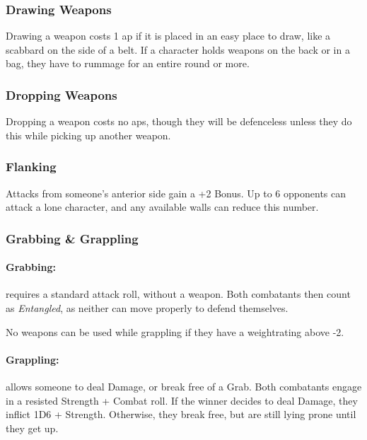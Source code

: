 \begin{multicols}{2}
\subsubsection[Drawing Weapon -- Cost: 1 \glsentrytext{ap}]{Drawing Weapons}

Drawing a weapon costs 1 \gls{ap} if it is placed in an easy place to draw, like a scabbard on the side of a belt.
If a character holds weapons on the back or in a bag, they have to rummage for an entire round or more.

\subsubsection[Dropping Weapon -- Cost: 0 \gls{ap}]{Dropping Weapons}

Dropping a weapon costs no \glspl{ap}, though they will be defenceless unless they do this while picking up another weapon.

\subsubsection[Flanking: Gain +2 to attack]{Flanking}\label{flank}

Attacks from someone's anterior side gain a +2 Bonus.
Up to 6 opponents can attack a lone character, and any available walls can reduce this number.


\subsubsection{Grabbing \& Grappling}
\label{grappling}

\paragraph[Grabs: Make an attack without any weapon bonus. Both combatants are \textit{Entangled}. Cost: 1 \gls{ap}]{Grabbing:}
requires a standard attack roll, without a weapon.
Both combatants then count as \textit{Entangled}, as neither can move properly to defend themselves.

No weapons can be used while grappling if they have a \gls{weightrating} above -2.

\paragraph[Grapple: Make an opposted roll of Strength + Combat.  Success means the combatant can either break free or inflict Damage.  Cost: 3 \gls{ap}]{Grappling:}
allows someone to deal Damage, or break free of a Grab.
Both combatants engage in a resisted Strength + Combat roll.
If the winner decides to deal Damage, they inflict 1D6 + Strength.
Otherwise, they break free, but are still lying prone until they get up.


\end{multicols}
